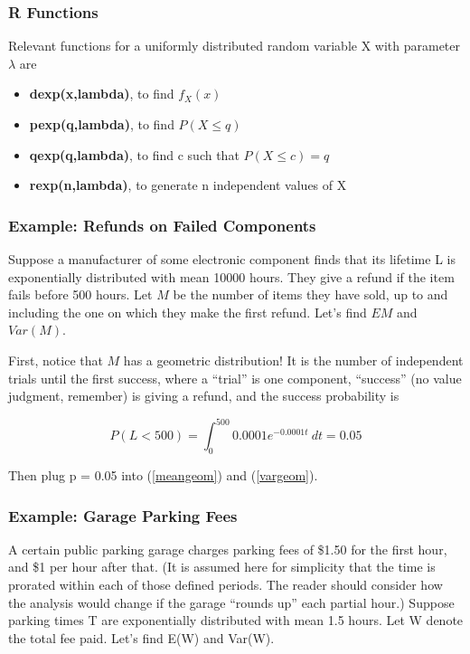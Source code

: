 \subsubsection{R Functions}

Relevant functions for a uniformly  distributed random variable X 
with parameter $\lambda$ are

\begin{itemize}

\item {\bf dexp(x,lambda)}, to find $f_X(x)$

\item {\bf pexp(q,lambda)}, to find $P(X \leq q)$

\item {\bf qexp(q,lambda)}, to find c such that $P(X \leq c) = q$

\item {\bf rexp(n,lambda)}, to generate n independent values of X

\end{itemize}

\subsubsection{Example:  Refunds on Failed Components}

Suppose a manufacturer of some electronic component finds that its
lifetime L is exponentially distributed with mean 10000 hours. They give a
refund if the item fails before 500 hours. Let $M$ be the number of items
they have sold, up to and including the one on which they make the first
refund. Let's find $EM$ and $Var(M)$.  

First, notice that $M$ has a geometric distribution!  It is the number of
independent trials until the first success, where a ``trial'' is one component,
``success'' (no value judgment, remember) is giving a refund, and the
success probability is

\begin{equation}
P(L < 500) = \int_{0}^{500} 0.0001 e^{-0.0001 t} ~ dt = 0.05
\end{equation}

Then plug p = 0.05 into (\ref{meangeom}) and (\ref{vargeom}). 

\subsubsection{Example:  Garage Parking Fees}

A certain public parking garage charges parking fees of \$1.50 for the
first hour, and \$1 per hour after that.  (It is assumed here for
simplicity that the time is prorated within each of those defined
periods.  The reader should consider how the analysis would change if
the garage ``rounds up'' each partial hour.) Suppose parking times T are
exponentially distributed with mean 1.5 hours.  Let W denote the total
fee paid.  Let's find E(W) and Var(W).


